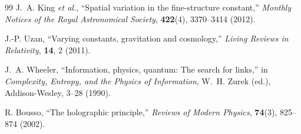 ﻿\documentclass[12pt,a4paper]{article}
\theoremstyle{plain}
\theoremstyle{definition}
\theoremstyle{remark}
\begin{document}
\begin{thebibliography}{99}
J.~A. King \textit{et al.}, ``Spatial variation in the fine-structure constant,''
\textit{Monthly Notices of the Royal Astronomical Society}, \textbf{422}(4), 3370--3414 (2012).

J.-P. Uzan, ``Varying constants, gravitation and cosmology,''
\textit{Living Reviews in Relativity}, \textbf{14}, 2 (2011).

J.~A. Wheeler, ``Information, physics, quantum: The search for links,'' in
\textit{Complexity, Entropy, and the Physics of Information}, W.~H. Zurek (ed.),
Addison-Wesley, 3--28 (1990).

R. Bousso, ``The holographic principle,''
\textit{Reviews of Modern Physics}, \textbf{74}(3), 825--874 (2002).

\end{thebibliography}
\end{document}
